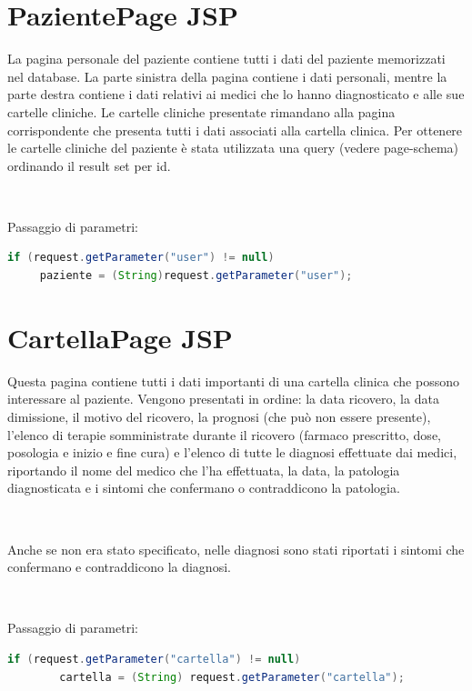 \documentclass[a4paper,titlepage]{article}
\begin{document}
\section{PazientePage JSP}

La pagina personale del paziente contiene tutti i dati del paziente memorizzati nel database. La parte sinistra della pagina contiene i dati personali, mentre la parte destra contiene i dati relativi ai medici che lo hanno diagnosticato e alle sue cartelle cliniche. Le cartelle cliniche presentate rimandano alla pagina corrispondente che presenta tutti i dati associati alla cartella clinica. Per ottenere le cartelle cliniche del paziente è stata utilizzata una query (vedere page-schema) ordinando il result set per id.


~

Passaggio di parametri: 

\begin{lstlisting}[language=java]
 if (request.getParameter("user") != null)
	 paziente = (String)request.getParameter("user");

\end{lstlisting}


\section{CartellaPage JSP}

Questa pagina contiene tutti i dati importanti di una cartella clinica che possono interessare al paziente. Vengono presentati in ordine: la data ricovero, la data dimissione, il motivo del ricovero, la prognosi (che può non essere presente), l'elenco di terapie somministrate durante il ricovero (farmaco prescritto, dose, posologia e inizio e fine cura) e l'elenco di tutte le diagnosi effettuate dai medici, riportando il nome del medico che l'ha effettuata, la data, la patologia diagnosticata e i sintomi che confermano o contraddicono la patologia.

~

Anche se non era stato specificato, nelle diagnosi sono stati riportati i sintomi che confermano e contraddicono la diagnosi.

~

Passaggio di parametri: 

\begin{lstlisting}[language=java]
	if (request.getParameter("cartella") != null)
		cartella = (String) request.getParameter("cartella");

\end{lstlisting}
\end{document}
